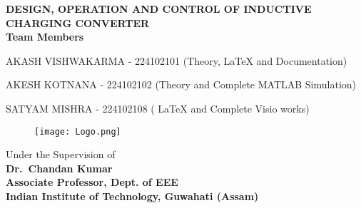 \makeatletter
\begin{titlepage}
\begin{center}

\uppercase{\textbf{\Large{DESIGN, OPERATION AND CONTROL OF INDUCTIVE CHARGING CONVERTER}}}
\\
\vspace{3cm}
\textbf{\large{Team Members}}
\vspace{1cm}
    \item AKASH VISHWAKARMA - 224102101 (Theory, LaTeX and Documentation)
    \item AKESH KOTNANA - 224102102 (Theory and Complete MATLAB Simulation)
    \item SATYAM MISHRA - 224102108 ( LaTeX and Complete Visio works)
\vspace{2cm}
\begin{figure}[h]
\centering
\texttt{[image: Logo.png]}
\end{figure}
\vspace{2cm}

Under the Supervision of\\
\textbf{Dr.\ Chandan Kumar}\\
\textbf{Associate Professor, Dept. of EEE}\\
\textbf{Indian Institute of Technology, Guwahati (Assam)}

\end{center}
\end{titlepage}
\makeatother